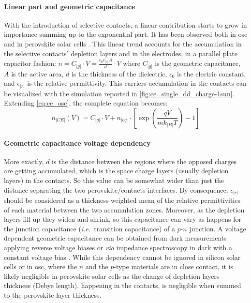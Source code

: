 		\paragraph{Linear part and geometric capacitance}\label{geometric_capacitance}
		With the introduction of selective contacts, a linear contribution starts to grow in importance summing up to the exponential part.
		It has been observed both in \gls{osc} \cite{Ryan2017a,Credgington2014,Credgington2012} and in perovskite solar cells \cite{Gelmetti2017,Wheeler2017,Du2018}.
		This linear trend accounts for the accumulation in the selective contacts' depletion layers and in the electrodes, in a parallel plate capacitor fashion: $n = C_|g| \cdot V = \frac{\epsilon_0 \epsilon_|r| A}{d} \cdot V$ where $C_|g|$ is the geometric capacitance, $A$ is the active area, $d$ is the thickness of the dielectric, $\epsilon_0$ is the electric constant, and $\epsilon_|r|$ is the relative permittivity.
		This carriers accumulation in the contacts can be visualized with the simulation reported in \cref{fig:ce_single_dd_charge-1sun}.
		Extending \cref{eq:ce_osc}, the complete equation becomes:
		\begin{equation}\label{eq:ce_full}
			n_|CE|(V) = C_|g| \cdot V + n_|eq| \cdot \left[\exp(\frac{qV}{mk_|B|T}) - 1\right]
		\end{equation}

		\paragraph{Geometric capacitance voltage dependency}\label{geometric_capacitance_and_voltage}
		More exactly, $d$ is the distance between the regions where the opposed charges are getting accumulated, which is the space charge layers (usually depletion layers) in the contacts.
		So this value can be somewhat wider than just the distance separating the two perovskite/contacts interfaces.
		By consequence, $\epsilon_|r|$ should be considered as a thickness\hyp{}weighted mean of the relative permittivities of each material between the two accumulation zones.
		Moreover, as the depletion layers fill up they widen and shrink, so this capacitance can vary as happens for the junction capacitance (\textsl{i.e.}\ transition capacitance) of a $p$-$n$ junction.
		A voltage dependent geometric capacitance can be obtained from dark  measurements applying reverse voltage biases \cite{Kiermasch2018} or \textsl{via} impedance spectroscopy in dark with a constant voltage bias \cite{Brus2016,Pockett2015}.
		While this dependency cannot be ignored in silicon solar cells or in \gls{osc}, where the $n$ and the $p$-type materials are in close contact, it is likely negligible in perovskite solar cells as the change of depletion layers thickness (Debye length), happening in the contacts, is negligible when summed to the perovskite layer thickness.

